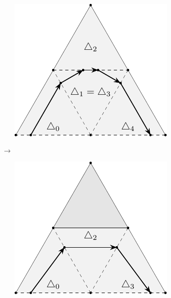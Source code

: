 \documentclass{stdlocal}
\begin{document}
  \begin{figure}
    \centering
    \begin{subfigure}[c]{0.38\linewidth}
      \centering
      \includegraphics[width=\linewidth]{figures/surface-mesh-curve-artifact.pdf}
    \end{subfigure}
    $\quad\longrightarrow\quad$
    \begin{subfigure}[c]{0.38\linewidth}
      \centering
      \includegraphics[width=\linewidth]{figures/surface-mesh-curve-artifact-removed.pdf}

\end{subfigure}
\end{figure}
\end{document}
